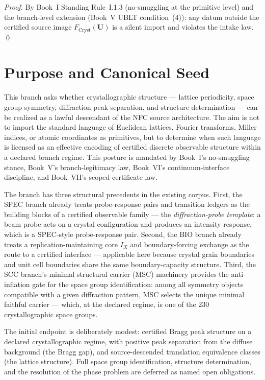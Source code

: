 \documentclass[12pt,oneside]{amsbook}
\theoremstyle{plain}
\theoremstyle{definition}
\theoremstyle{remark}
\begin{document}
\begin{proof}
By Book~I Standing Rule~I.1.3 (no-smuggling at the primitive level)
and the branch-level extension (Book~V UBLT condition~(4)):
any datum outside the certified source image $F_{\mathrm{Cryst}}(\mathbf{U})$
is a silent import and violates the intake law.
\qed
\end{proof}

\section{Purpose and Canonical Seed}
\label{sec:cryst-purpose}

This branch asks whether crystallographic structure --- lattice
periodicity, space group symmetry, diffraction peak separation, and
structure determination --- can be realized as a lawful descendant of
the NFC source architecture.  The aim is not to import the standard
language of Euclidean lattices, Fourier transforms, Miller indices,
or atomic coordinates as primitives, but to determine when such
language is licensed as an effective encoding of certified discrete
observable structure within a declared branch regime.  This posture
is mandated by Book~I's no-smuggling stance, Book~V's
branch-legitimacy law, Book~VI's continuum-interface discipline, and
Book~VII's scoped-certificate law.

The branch has three structural precedents in the existing corpus.
First, the SPEC branch already treats probe-response pairs and
transition ledgers as the building blocks of a certified observable
family --- the \emph{diffraction-probe template}: a beam probe acts
on a crystal configuration and produces an intensity response, which
is a SPEC-style probe-response pair.  Second, the BIO branch already
treats a replication-maintaining core $I_X$ and boundary-forcing
exchange as the route to a certified interface --- applicable here
because crystal grain boundaries and unit cell boundaries share the
same boundary-capacity structure.  Third, the SCC branch's minimal
structural carrier (MSC) machinery provides the anti-inflation gate
for the space group identification: among all symmetry objects
compatible with a given diffraction pattern, MSC selects the unique
minimal faithful carrier --- which, at the declared regime, is one
of the 230 crystallographic space groups.

The initial endpoint is deliberately modest: certified Bragg peak
structure on a declared crystallographic regime, with positive peak
separation from the diffuse background (the Bragg gap), and
source-descended translation equivalence classes (the lattice
structure).  Full space group identification, structure
determination, and the resolution of the phase problem are deferred
as named open obligations.
\end{document}
